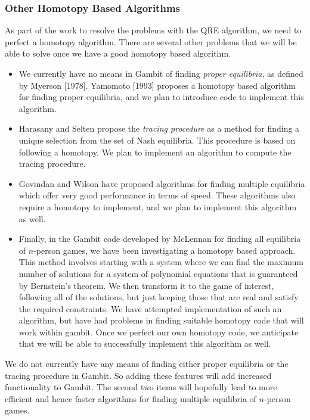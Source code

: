 \documentclass[12pt]{article}
\begin{document}
\subsubsection{Other Homotopy Based Algorithms}
As part of the work to resolve the problems with the QRE algorithm, we
need to perfect a homotopy algorithm.  There are several other
problems that we will be able to solve once we have a good homotopy
based algorithm.  

\begin{itemize} 
\item
We currently have no means in Gambit of finding {\it proper
equilibria}, as defined by Myerson [1978].  Yamomoto [1993] proposes a
homotopy based algorithm for finding proper equilibria, and we plan to
introduce code to implement this algorithm.
\item
Harasany and Selten propose the {\it tracing procedure} as a method
for finding a unique selection from the set of Nash equilibria.  This
procedure is based on following a homotopy.  We plan to implement an
algorithm to compute the tracing procedure.
\item
Govindan and Wilson have proposed algorithms for finding multiple
equilibria which offer very good performance in terms of speed.  These
algorithms also require a homotopy to implement, and we plan to
implement this algorithm as well.
\item
Finally, in the Gambit code developed by McLennan for finding all
equilibria of $n$-person games, we have been investigating a homotopy
based approach.  This method involves starting with a system where we
can find the maximum number of solutions for a system of polynomial
equations that is guaranteed by Bernstein's theorem.  We then
transform it to the game of interest, following all of the solutions,
but just keeping those that are real and satisfy the required
constraints.  We have attempted implementation of such an algorithm,
but have had problems in finding suitable homotopy code that will work
within gambit.  Once we perfect our own homotopy code, we anticipate
that we will be able to successfully implement this algorithm as well.
\end{itemize}

We do not currently have any means of finding either proper equilibria
or the tracing procedure in Gambit.  So adding these features will add
increased functionality to Gambit.  The second two items will
hopefully lead to more efficient and hence faster algorithms for
finding multiple equilibria of $n$-person games.
\end{document}
